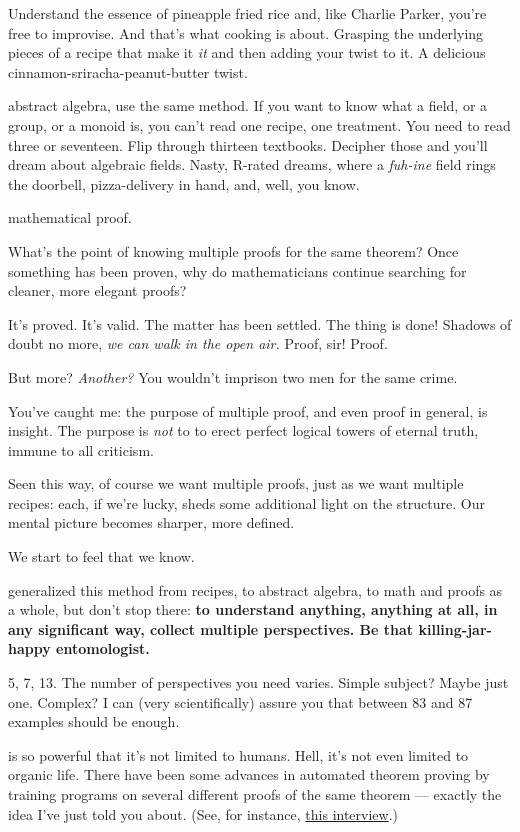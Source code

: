 Understand the essence of pineapple fried rice and, like Charlie Parker, you're free to improvise. And that's what cooking is about. Grasping the underlying pieces of a recipe
that make it \textit{it} and then adding your twist to it. A delicious
cinnamon-sriracha-peanut-butter twist.

 abstract algebra, use the same method. If you want to know what a field,
or a group, or a monoid is, you can't read one recipe, one treatment. You need
to read three or seventeen. Flip through thirteen textbooks. Decipher those and
you'll dream about algebraic fields. Nasty, R-rated dreams, where a
\textit{fuh-ine} field rings the doorbell, pizza-delivery in hand, and, well, you know.

 mathematical proof.

What's the point of knowing multiple proofs for the same theorem? Once something
has been proven, why do mathematicians continue searching for cleaner, more
elegant proofs?

It's proved. It's valid. The matter has been settled. The thing is done! Shadows
of doubt no more, \textit{we can walk in the open air.} Proof, sir! Proof.

But more? \textit{Another?} You wouldn't imprison two men for the same crime.

 You've caught me: the purpose of multiple proof, and even proof in
general, is insight. The purpose is \textit{not} to to erect perfect logical
towers of eternal truth, immune to all criticism.

Seen this way, of course we want multiple proofs, just as we want multiple
recipes: each, if we're lucky, sheds some additional light on the structure. Our mental
picture becomes sharper, more defined.

We start to feel that we know.

 generalized this method from recipes, to abstract algebra, to math and proofs
as a whole, but don't stop there: \textbf{to understand anything, anything at all, in
  any significant way, collect multiple perspectives. Be that killing-jar-happy
  entomologist.}

5, 7, 13. The number of perspectives you need varies. Simple subject? Maybe just
one. Complex? I can (very scientifically) assure you that between 83 and 87
examples should be enough.

 is so powerful that it's not limited to humans. Hell, it's
not even limited to organic life. There have been some advances in
automated theorem proving by training programs on several different proofs of
the same theorem --- exactly the idea I've just told you about. (See, for
instance, \href{http://intelligence.org/2013/12/21/josef-urban-on-machine-learning-and-automated-reasoning/}{this interview}.)



